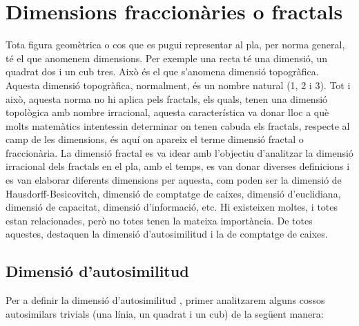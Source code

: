 \documentclass[12pt,a4paper]{report}
\begin{document}
\section{Dimensions fraccionàries o fractals}
Tota figura geomètrica o cos que es pugui representar al pla, per norma general, té el que anomenem dimensions. Per exemple una recta té una dimensió, un quadrat dos i un cub tres. Això és el que s’anomena dimensió topogràfica. Aquesta dimensió topogràfica, normalment, és un nombre natural (1, 2 i 3). Tot i això, aquesta norma no hi aplica pels fractals, els quals, tenen una dimensió topològica amb nombre irracional, aquesta característica va donar lloc a què molts matemàtics intentessin determinar on tenen cabuda els fractals, respecte al camp de les dimensions, és aquí on apareix el terme dimensió fractal o fraccionària. La dimensió fractal es va idear amb l’objectiu d’analitzar la dimensió irracional dels fractals en el pla, amb el temps, es van donar diverses definicions i es van elaborar diferents dimensions per aquesta, com poden ser la dimensió de Hausdorff-Besicovitch, dimensió de comptatge de caixes, dimensió d'euclidiana, dimensió de capacitat, dimensió d’informació, etc. Hi existeixen moltes, i totes estan relacionades, però no totes tenen la mateixa importància. De totes aquestes, destaquen la dimensió d'autosimilitud i la de comptatge de caixes.
\subsection{Dimensió d'autosimilitud}
Per a definir la dimensió d'autosimilitud \cite[p.~194]{FistCourseChaos}, primer analitzarem alguns cossos autosimilars trivials (una línia, un quadrat i un cub) de la següent manera:
\end{document}
